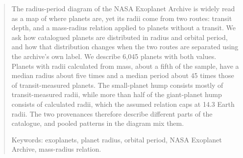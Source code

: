 \begin{abstract}
\noindent The radius-period diagram of the NASA Exoplanet Archive is widely read as a map of where planets are, yet its radii come from two routes: transit depth, and a mass-radius relation applied to planets without a transit. We ask how catalogued planets are distributed in radius and orbital period, and how that distribution changes when the two routes are separated using the archive's own label. We describe 6,045 planets with both values.
Planets with radii calculated from mass, about a fifth of the sample, have a median radius about five times and a median period about 45 times those of transit-measured planets.
The small-planet hump consists mostly of transit-measured radii, while more than half of the giant-planet hump consists of calculated radii, which the assumed relation caps at 14.3 Earth radii.
The two provenances therefore describe different parts of the catalogue, and pooled patterns in the diagram mix them.

\medskip
\noindent Keywords: exoplanets, planet radius, orbital period, NASA Exoplanet Archive, mass-radius relation.
\end{abstract}
